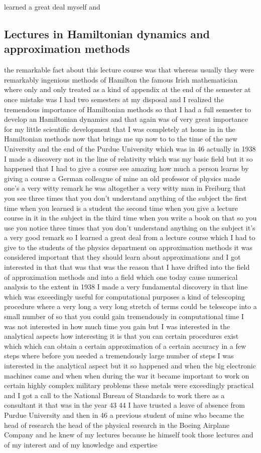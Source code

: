 \documentclass{article}
\begin{document}
learned a great deal myself and

\subsection{Lectures in Hamiltonian dynamics and approximation methods}
the remarkable fact about this lecture course was that whereas usually they were remarkably ingenious methods of Hamilton the famous Irish mathematician where only and only treated as a kind of appendix at the end of the semester at once mistake was I had two semesters at my disposal and I realized the tremendous importance of Hamiltonian methods so that I had a full semester to develop an Hamiltonian dynamics and that again was of very great importance for my little scientific development that I was completely at home in in the Hamiltonian methods now that brings me up now to to the time of the new University and the end of the Purdue University which was in 46 actually in 1938 I made a discovery not in the line of relativity which was my basic field but it so happened that I had to give a course see amazing how much a person learns by giving a course a German colleague of mine an old professor of physics made one's a very witty remark he was altogether a very witty man in Freiburg that you see three times that you don't understand anything of the subject the first time when you learned is a student the second time when you give a lecture course in it in the subject in the third time when you write a book on that so you use you notice three times that you don't understand anything on the subject it's a very good remark so I learned a great deal from a lecture course which I had to give to the students of the physics department on approximation methods it was considered important that they should learn about approximations and I got interested in that that was that was the reason that I have drifted into the field of approximation methods and into a field which one today cause numerical analysis to the extent in 1938 I made a very fundamental discovery in that line which was exceedingly useful for computational purposes a kind of telescoping procedure where a very long a very long stretch of terms could be telescope into a small number of so that you could gain tremendously in computational time I was not interested in how much time you gain but I was interested in the analytical aspects how interesting it is that you can certain procedures exist which which can obtain a certain approximation of a certain accuracy in a few steps where before you needed a tremendously large number of steps I was interested in the analytical aspect but it so happened and when the big electronic machines came and when when during the war it became important to work on certain highly complex military problems these metals were exceedingly practical and I got a call to the National Bureau of Standards to work there as a consultant it that was in the year 43 44 I have trusted a leave of absence from Purdue University and then in 46 a previous student of mine who became the head of research the head of the physical research in the Boeing Airplane Company and he knew of my lectures because he himself took those lectures and of my interest and of my knowledge and expertise 
\end{document}
